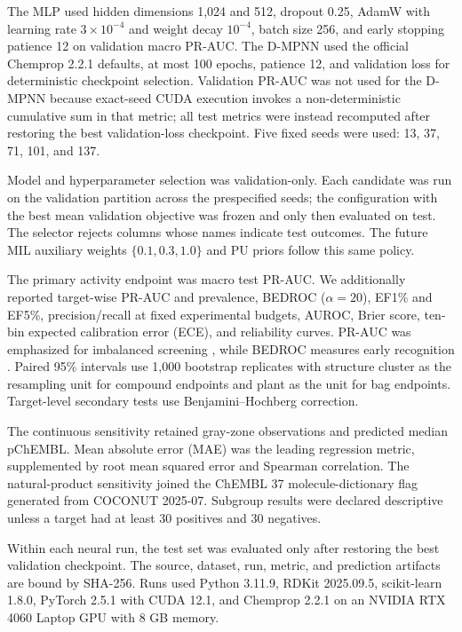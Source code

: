 \documentclass[11pt]{article}
\begin{document}
The MLP used hidden dimensions 1,024 and 512, dropout 0.25, AdamW with learning
rate $3\times10^{-4}$ and weight decay $10^{-4}$, batch size 256, and early
stopping patience 12 on validation macro PR-AUC. The D-MPNN used the official
Chemprop 2.2.1 defaults, at most 100 epochs, patience 12, and validation loss
for deterministic checkpoint selection. Validation PR-AUC was not used for the
D-MPNN because exact-seed CUDA execution invokes a non-deterministic cumulative
sum in that metric; all test metrics were instead recomputed after restoring the
best validation-loss checkpoint. Five fixed seeds were used: 13, 37, 71, 101,
and 137.

Model and hyperparameter selection was validation-only. Each candidate was run
on the validation partition across the prespecified seeds; the configuration
with the best mean validation objective was frozen and only then evaluated on
test. The selector rejects columns whose names indicate test outcomes. The
future MIL auxiliary weights $\{0.1,0.3,1.0\}$ and PU priors follow this same
policy.

The primary activity endpoint was macro test PR-AUC. We additionally reported
target-wise PR-AUC and prevalence, BEDROC ($\alpha=20$), EF1\% and EF5\%,
precision/recall at fixed experimental budgets, AUROC, Brier score, ten-bin
expected calibration error (ECE), and reliability curves. PR-AUC was emphasized for imbalanced screening
\citep{saito2015pr}, while BEDROC measures early recognition
\citep{truchon2007bedroc}. Paired 95\% intervals use 1,000 bootstrap replicates
with structure cluster as the resampling unit for compound endpoints and plant
as the unit for bag endpoints. Target-level secondary tests use
Benjamini--Hochberg correction.

The continuous sensitivity retained gray-zone observations and predicted median
pChEMBL. Mean absolute error (MAE) was the leading regression metric, supplemented
by root mean squared error and Spearman correlation. The natural-product
sensitivity joined the ChEMBL 37 molecule-dictionary flag generated from
COCONUT 2025-07. Subgroup results were declared descriptive unless a target had
at least 30 positives and 30 negatives.

Within each neural run, the test set was evaluated only after restoring the best
validation checkpoint. The source, dataset, run, metric, and prediction
artifacts are bound by SHA-256. Runs used Python 3.11.9, RDKit 2025.09.5,
scikit-learn 1.8.0, PyTorch 2.5.1 with CUDA 12.1, and Chemprop 2.2.1 on an
NVIDIA RTX 4060 Laptop GPU with 8 GB memory.
\end{document}
